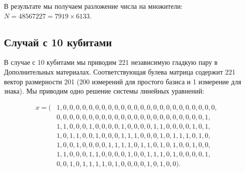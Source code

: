 В результате мы получаем разложение числа на множители:
$N = 48567227 = 7919 \times 6133$.

\subsection*{Случай с 10 кубитами}

В случае с 10 кубитами мы приводим 221 независимую гладкую пару в
Дополнительных материалах. Соответствующая булева матрица содержит 221 вектор
размерности 201 (200 измерений для простого базиса и 1 измерение для знака). Мы
приводим одно решение системы линейных уравнений:

\begin{equation}
\begin{aligned}
x = (&1, 0, 0, 0, 0, 0, 0, 0, 0, 0, 0, 0, 0, 0, 0, 0, 0, 0, 0, 0, 0, 0, 0, 0, 0, \\
     &0, 0, 0, 0, 0, 0, 0, 0, 0, 0, 0, 0, 0, 0, 0, 0, 0, 0, 0, 0, 0, 0, 0, 1, \\
     &1, 1, 0, 0, 0, 1, 0, 0, 0, 0, 1, 0, 0, 0, 0, 1, 1, 0, 0, 0, 0, 1, 0, 1, \\
     &1, 0, 1, 1, 0, 0, 1, 0, 0, 0, 1, 1, 1, 0, 0, 0, 1, 0, 1, 1, 1, 0, 1, 0, \\
     &1, 0, 0, 1, 0, 0, 0, 0, 1, 1, 1, 1, 0, 1, 1, 0, 1, 0, 1, 0, 0, 1, 0, 0, \\
     &1, 1, 0, 0, 0, 1, 1, 0, 0, 0, 0, 1, 0, 0, 1, 1, 1, 0, 1, 0, 0, 0, 0, 1, \\
     &0, 0, 1, 0, 1, 1, 1, 1, 0, 1, 0, 0, 0, 0, 1, 0, 1, 0, 0).
\end{aligned}
\end{equation}

